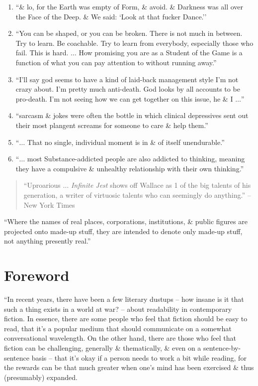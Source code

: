 \documentclass{article}
\numberwithin{equation}{section}
\begin{document}
\begin{enumerate}
	\item ``\& lo, for the Earth was empty of Form, \& avoid. \& Darkness was all over the Face of the Deep. \& We said: `Look at that fucker Dance.''
	\item ``You can be shaped, or you can be broken. There is not much in between. Try to learn. Be coachable. Try to learn from everybody, especially those who fail. This is hard. $\ldots$ How promising you are as a Student of the Game is a function of what you can pay attention to without running away.''
	\item ``I'll say god seems to have a kind of laid-back management style I'm not crazy about. I'm pretty much anti-death. God looks by all accounts to be pro-death. I'm not seeing how we can get together on this issue, he \& I $\ldots$''
	\item ``sarcasm \& jokes were often the bottle in which clinical depressives sent out their most plangent screams for someone to care \& help them.''
	\item ``$\ldots$ That no single, individual moment is in \& of itself unendurable.''
	\item ``$\ldots$ most Substance-addicted people are also addicted to thinking, meaning they have a compulsive \& unhealthy relationship with their own thinking.''
\end{enumerate}


\begin{quotation}
	``Uproarious $\ldots$ \textit{Infinite Jest} shows off Wallace as 1 of the big talents of his generation, a writer of virtuosic talents who can seemingly do anything.'' -- New York Times
\end{quotation}
``Where the names of real places, corporations, institutions, \& public figures are projected onto made-up stuff, they are intended to denote only made-up stuff, not anything presently real.''


\section*{Foreword}
``In recent years, there have been a few literary dustups -- how insane is it that such a thing exists in a world at war? -- about readability in contemporary fiction. In essence, there are some people who feel that fiction should be easy to read, that it's a popular medium that should communicate on a somewhat conversational wavelength. On the other hand, there are those who feel that fiction can be challenging, generally \& thematically, \& even on a sentence-by-sentence basis -- that it's okay if a person needs to work a bit while reading, for the rewards can be that much greater when one's mind has been exercised \& thus (presumably) expanded.
\end{document}
